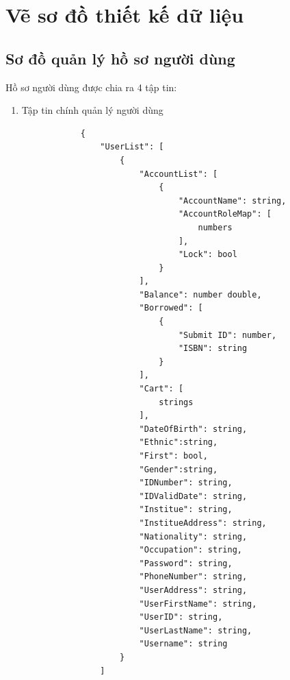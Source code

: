 \documentclass[12pt,a4paper]{report}
\begin{document}
    \section{Vẽ sơ đồ thiết kế dữ liệu}
        \subsection{Sơ đồ quản lý hồ sơ người dùng}
        Hồ sơ người dùng được chia ra 4 tập tin:
        \begin{enumerate}
            \item Tập tin chính quản lý người dùng
%
%
%
            \begin{verbatim}
            {
                "UserList": [
                    {
                        "AccountList": [
                            {
                                "AccountName": string,
                                "AccountRoleMap": [
                                    numbers
                                ],
                                "Lock": bool
                            }
                        ],
                        "Balance": number double,
                        "Borrowed": [
                            {
                                "Submit ID": number,
                                "ISBN": string
                            }
                        ],
                        "Cart": [
                            strings
                        ],
                        "DateOfBirth": string,
                        "Ethnic":string,
                        "First": bool,
                        "Gender":string,
                        "IDNumber": string,
                        "IDValidDate": string,
                        "Institue": string,
                        "InstitueAddress": string,
                        "Nationality": string,
                        "Occupation": string,
                        "Password": string,
                        "PhoneNumber": string,
                        "UserAddress": string,
                        "UserFirstName": string,
                        "UserID": string,
                        "UserLastName": string,
                        "Username": string
                    }
                ]

\end{verbatim}
\end{enumerate}
\end{document}
